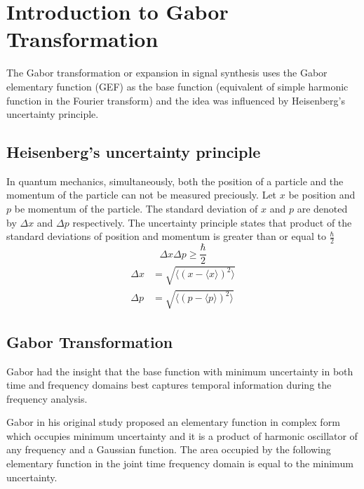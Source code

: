 \section{Introduction to Gabor Transformation}
The Gabor transformation or expansion in signal synthesis uses the Gabor elementary function (GEF) as the base function (equivalent of simple harmonic function in the Fourier transform) and the idea was influenced by Heisenberg's uncertainty principle.  \\
\subsection{Heisenberg's uncertainty principle}
In quantum mechanics, simultaneously, both the position of a particle and the momentum of the particle can not be measured preciously. Let $x$ be position and $p$ be momentum of the particle. The standard deviation of $x$ and $p$ are denoted by $\Delta x$ and $\Delta p$ respectively. The uncertainty principle states that product of the standard deviations of position and momentum is greater than or equal to $\frac{\hbar}{2}$
\begin{equation*}
\Delta x\Delta p \geq \frac{\hbar}{2}
\end{equation*}
\begin{equation*}
\begin{split}
\Delta x &= \sqrt{\langle(x - \langle x\rangle)^2\rangle} \\
\Delta p &= \sqrt{\langle(p - \langle p \rangle)^2\rangle}
\end{split}
\end{equation*}

\subsection{Gabor Transformation }
Gabor had the insight that the base function with minimum uncertainty in both time and frequency domains best captures temporal information during the frequency analysis.

Gabor in his original study proposed an elementary function in complex form which occupies minimum uncertainty and it is a product of harmonic oscillator of any frequency and a Gaussian function. The area occupied by the following elementary function in the joint time frequency domain is equal to the minimum uncertainty.

